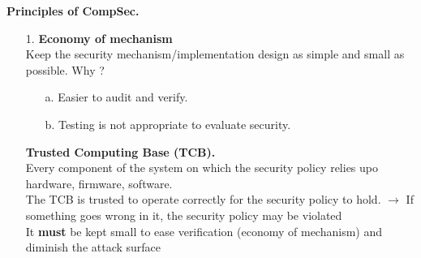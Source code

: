 \documentclass[8pt]{article}
\begin{document}
\hline
\vspace{8px}
\noindent \begin{minipage}[htp]{0.49\textwidth}
	\noindent \textbf{Principles of CompSec.}
	\begin{itemize}
		\item[1.] \textbf{Economy of mechanism}\\
		      Keep the security mechanism/implementation design as simple and small as possible. Why ?
		      \begin{itemize}
			      \item[a.] Easier to audit and verify.
			      \item[b.] Testing is not appropriate to evaluate security.
		      \end{itemize}
		      \noindent \textbf{Trusted Computing Base (TCB).}\\
		      Every component of the system on which the security policy relies upo hardware, firmware, software. \\The TCB is trusted to operate correctly for the security policy to hold. $\to$ If something goes wrong in it, the security policy may be violated\\
		      It \textbf{must} be kept small to ease verification (economy of mechanism) and diminish the attack surface


\end{itemize}
\end{minipage}
\end{document}

